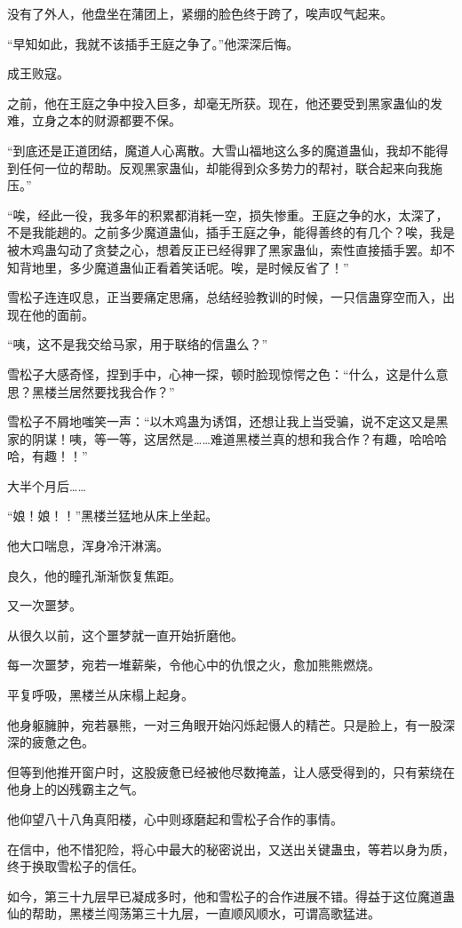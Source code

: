 \begin{this_body}
没有了外人，他盘坐在蒲团上，紧绷的脸色终于跨了，唉声叹气起来。

“早知如此，我就不该插手王庭之争了。”他深深后悔。

成王败寇。

之前，他在王庭之争中投入巨多，却毫无所获。现在，他还要受到黑家蛊仙的发难，立身之本的财源都要不保。

“到底还是正道团结，魔道人心离散。大雪山福地这么多的魔道蛊仙，我却不能得到任何一位的帮助。反观黑家蛊仙，却能得到众多势力的帮衬，联合起来向我施压。”

“唉，经此一役，我多年的积累都消耗一空，损失惨重。王庭之争的水，太深了，不是我能趟的。之前多少魔道蛊仙，插手王庭之争，能得善终的有几个？唉，我是被木鸡蛊勾动了贪婪之心，想着反正已经得罪了黑家蛊仙，索性直接插手罢。却不知背地里，多少魔道蛊仙正看着笑话呢。唉，是时候反省了！”

雪松子连连叹息，正当要痛定思痛，总结经验教训的时候，一只信蛊穿空而入，出现在他的面前。

“咦，这不是我交给马家，用于联络的信蛊么？”

雪松子大感奇怪，捏到手中，心神一探，顿时脸现惊愕之色：“什么，这是什么意思？黑楼兰居然要找我合作？”

雪松子不屑地嗤笑一声：“以木鸡蛊为诱饵，还想让我上当受骗，说不定这又是黑家的阴谋！咦，等一等，这居然是……难道黑楼兰真的想和我合作？有趣，哈哈哈哈，有趣！！”

大半个月后……

“娘！娘！！”黑楼兰猛地从床上坐起。

他大口喘息，浑身冷汗淋漓。

良久，他的瞳孔渐渐恢复焦距。

又一次噩梦。

从很久以前，这个噩梦就一直开始折磨他。

每一次噩梦，宛若一堆薪柴，令他心中的仇恨之火，愈加熊熊燃烧。

平复呼吸，黑楼兰从床榻上起身。

他身躯臃肿，宛若暴熊，一对三角眼开始闪烁起慑人的精芒。只是脸上，有一股深深的疲惫之色。

但等到他推开窗户时，这股疲惫已经被他尽数掩盖，让人感受得到的，只有萦绕在他身上的凶残霸主之气。

他仰望八十八角真阳楼，心中则琢磨起和雪松子合作的事情。

在信中，他不惜犯险，将心中最大的秘密说出，又送出关键蛊虫，等若以身为质，终于换取雪松子的信任。

如今，第三十九层早已凝成多时，他和雪松子的合作进展不错。得益于这位魔道蛊仙的帮助，黑楼兰闯荡第三十九层，一直顺风顺水，可谓高歌猛进。


\end{this_body}
